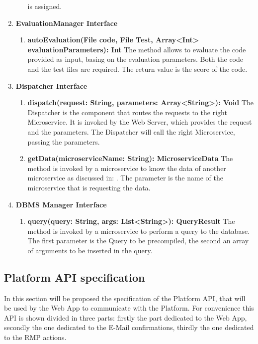 \begin{enumerate}
\begin{enumerate}[label=$\bullet$]
            is assigned.
        \end{enumerate}
    \item \textbf{EvaluationManager Interface}
        \begin{enumerate}[label=$\bullet$]
            \item \textbf{autoEvaluation(File code, File Test, Array<Int> evaluationParameters): Int} The method allows to evaluate the code provided as input, basing on the evaluation parameters. Both the code and the test files are
            required. The return value is the score of the code.
        \end{enumerate}
    \item \textbf{Dispatcher Interface}
        \begin{enumerate}[label=$\bullet$]
            \item \textbf{dispatch(request: String, parameters: Array<String>): Void} The Dispatcher is the component that routes the requests to the right Microservice. It is invoked by the Web Server, which provides the request and the 
            parameters. The Dispatcher will call the right Microservice, passing the parameters.
            \item \textbf{getData(microserviceName: String): MicroserviceData} \label{meth:dispGetData}The method is invoked by a microservice to know the data of another microservice as discussed in: . The parameter is the name of the microservice that is requesting the data.
        \end{enumerate}
    \item \textbf{DBMS Manager Interface}
        \begin{enumerate} [label=$\bullet$]
            \item \textbf{query(query: String, args: List<String>): QueryResult} The method is invoked by a microservice to perform a query to the database. The first parameter is the Query to be precompiled, the second an array of arguments to be inserted in the query.
    \end{enumerate}
\end{enumerate}
\subsection{Platform API specification}
In this section will be proposed the specification of the Platform API, that will be used by the Web App to communicate with the Platform.
For convenience this API is shown divided in three parts: firstly the part dedicated to the Web App, secondly the one dedicated to the E-Mail confirmations, thirdly the one dedicated to the RMP actions.
